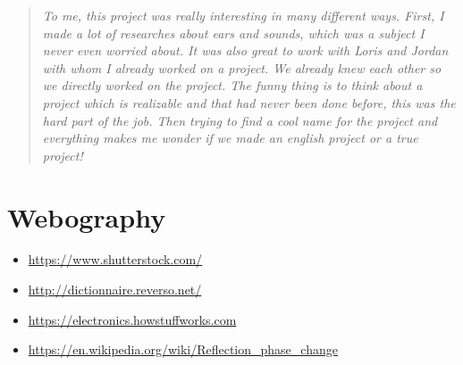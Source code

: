 \documentclass[12pt, a4paper]{article}
\begin{document}
    \begin{quotation}
    \emph{To me, this project was really interesting in many different ways. First, I made a lot of researches about ears and sounds, which was a subject I never even worried about. It was also great to work with Loris and Jordan with whom I already worked on a project. We already knew each other so we directly worked on the project. The funny thing is to think about a project which is realizable and that had never been done before, this was the hard part of the job. 
    Then trying to find a cool name for the project and everything makes me wonder if we made an english project or a true project!}
    \end{quotation}

    \section{Webography}

    \begin{itemize}
    \item \url{https://www.shutterstock.com/}
    \item \url{http://dictionnaire.reverso.net/}
    \item \url{https://electronics.howstuffworks.com}
    \item \url{https://en.wikipedia.org/wiki/Reflection_phase_change}
    \end{itemize}

\end{document}
